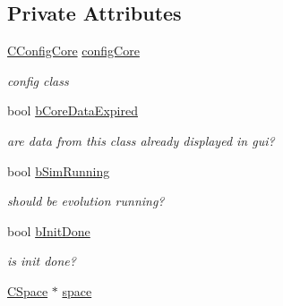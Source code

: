 \subsection*{Private Attributes}
\begin{DoxyCompactItemize}
\item 
\hypertarget{classCCore_a88cfee1f612c96f3bfede6a20ca5cabd}{
\hyperlink{classCConfigCore}{CConfigCore} \hyperlink{classCCore_a88cfee1f612c96f3bfede6a20ca5cabd}{configCore}}
\label{classCCore_a88cfee1f612c96f3bfede6a20ca5cabd}

\begin{DoxyCompactList}\small\item\em config class \item\end{DoxyCompactList}\item 
\hypertarget{classCCore_a6813b6f89b401a896381a19b04fc509a}{
bool \hyperlink{classCCore_a6813b6f89b401a896381a19b04fc509a}{bCoreDataExpired}}
\label{classCCore_a6813b6f89b401a896381a19b04fc509a}

\begin{DoxyCompactList}\small\item\em are data from this class already displayed in gui? \item\end{DoxyCompactList}\item 
\hypertarget{classCCore_ad0b15abbb2cfc189f6639b1e45041a6d}{
bool \hyperlink{classCCore_ad0b15abbb2cfc189f6639b1e45041a6d}{bSimRunning}}
\label{classCCore_ad0b15abbb2cfc189f6639b1e45041a6d}

\begin{DoxyCompactList}\small\item\em should be evolution running? \item\end{DoxyCompactList}\item 
\hypertarget{classCCore_ad6381478361c75e7be735b6003e45dbd}{
bool \hyperlink{classCCore_ad6381478361c75e7be735b6003e45dbd}{bInitDone}}
\label{classCCore_ad6381478361c75e7be735b6003e45dbd}

\begin{DoxyCompactList}\small\item\em is init done? \item\end{DoxyCompactList}\item 
\hypertarget{classCCore_ad744c98c0206358039db24d89a26e913}{
\hyperlink{classCSpace}{CSpace} $\ast$ \hyperlink{classCCore_ad744c98c0206358039db24d89a26e913}{space}}
\label{classCCore_ad744c98c0206358039db24d89a26e913}


\end{DoxyCompactItemize}
